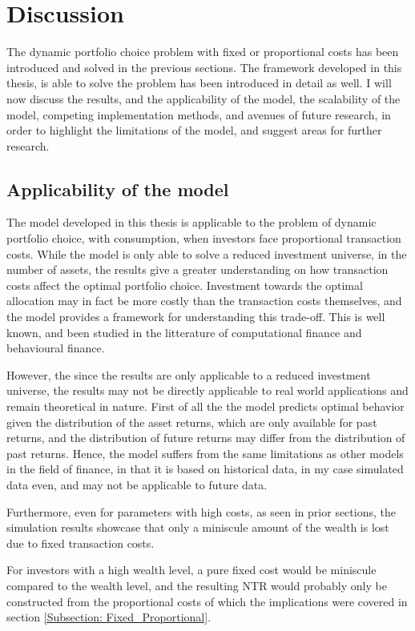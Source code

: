 \documentclass[11pt]{article}
\begin{document}
\fi
\section{Discussion} \label{Section: Discussion}
The dynamic portfolio choice problem with fixed or proportional costs has been introduced and solved in the previous sections.
The framework developed in this thesis, is able to solve the problem has been introduced in detail as well.
I will now discuss the results, and the applicability of the model, the scalability of the model, competing implementation methods, and avenues of future research,
in order to highlight the limitations of the model, and suggest areas for further research.

\subsection{Applicability of the model} \label{Subsection: Applicability of the model}
The model developed in this thesis is applicable to the problem of dynamic portfolio choice, with consumption, when investors face proportional transaction costs.
While the model is only able to solve a reduced investment universe, in the number of assets, the
results give a greater understanding on how transaction costs affect the optimal portfolio choice.
Investment towards the optimal allocation may in fact be more costly than the transaction costs themselves, and the model provides a framework for understanding this trade-off.
This is well known, and been studied in the litterature of computational finance and behavioural finance.

However, the since the results are only applicable to a reduced investment universe, the results may not be directly applicable to real world applications
and remain theoretical in nature. First of all the the model predicts optimal behavior given the distribution of the asset returns,
which are only available for past returns, and the distribution of future returns may differ from the distribution of past returns.
Hence, the model suffers from the same limitations as other models in the field of finance, in that it is based on historical data,
in my case simulated data even, and may not be applicable to future data.

Furthermore, even for parameters with high costs, as seen in prior sections, the simulation results showcase that only a miniscule amount of the wealth is lost due to fixed transaction costs.

For investors with a high wealth level, a pure fixed cost would be miniscule compared to the wealth level,
and the resulting \ac{NTR} would probably only be constructed from the proportional costs of which the implications were covered in section \ref{Subsection: Fixed_Proportional}.
\end{document}
